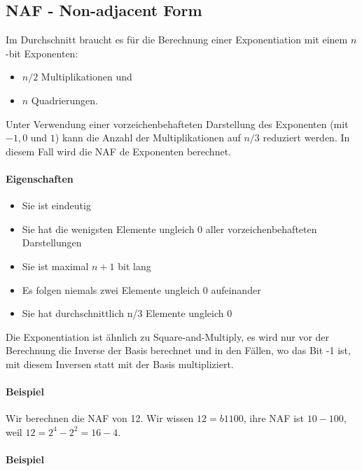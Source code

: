 \subsection{NAF - Non-adjacent Form}

Im Durchschnitt braucht es für die Berechnung einer Exponentiation mit einem $n$-bit Exponenten:

\begin{itemize}
    \item $n/2$ Multiplikationen und
    \item $n$ Quadrierungen.
\end{itemize}

Unter Verwendung einer vorzeichenbehafteten Darstellung des Exponenten (mit $-1, 0$ und $1$) kann die Anzahl der Multiplikationen auf $n/3$ reduziert werden. In diesem Fall
wird die NAF de Exponenten berechnet.

\paragraph{Eigenschaften}

\begin{itemize}
    \item Sie ist eindeutig
    \item Sie hat die wenigsten Elemente ungleich 0 aller vorzeichenbehafteten Darstellungen
    \item Sie ist maximal $n+1$ bit lang 
    \item Es folgen niemals zwei Elemente ungleich 0 aufeinander 
    \item Sie hat durchschnittlich n/3 Elemente ungleich 0
\end{itemize}

Die Exponentiation ist ähnlich zu Square-and-Multiply, es wird nur vor der Berechnung die Inverse der Basis berechnet und in den Fällen, wo das Bit -1 ist, mit diesem 
Inversen statt mit der Basis multipliziert.

\paragraph{Beispiel} 

Wir berechnen die NAF von 12. Wir wissen $12 = b1100$, ihre NAF ist $10-100$, weil $12 = 2^4 - 2^2 = 16 - 4$.

\paragraph{Beispiel}

